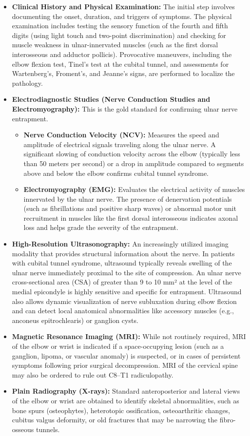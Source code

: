 \begin{itemize}
\item \textbf{Clinical History and Physical Examination:} The initial step involves documenting the onset, duration, and triggers of symptoms. The physical examination includes testing the sensory function of the fourth and fifth digits (using light touch and two-point discrimination) and checking for muscle weakness in ulnar-innervated muscles (such as the first dorsal interosseous and adductor pollicis). Provocative maneuvers, including the elbow flexion test, Tinel's test at the cubital tunnel, and assessments for Wartenberg's, Froment's, and Jeanne's signs, are performed to localize the pathology.
\item \textbf{Electrodiagnostic Studies (Nerve Conduction Studies and Electromyography):} This is the gold standard for confirming ulnar nerve entrapment.
  \begin{itemize}
  \item \textbf{Nerve Conduction Velocity (NCV):} Measures the speed and amplitude of electrical signals traveling along the ulnar nerve. A significant slowing of conduction velocity across the elbow (typically less than 50 meters per second) or a drop in amplitude compared to segments above and below the elbow confirms cubital tunnel syndrome.
  \item \textbf{Electromyography (EMG):} Evaluates the electrical activity of muscles innervated by the ulnar nerve. The presence of denervation potentials (such as fibrillations and positive sharp waves) or abnormal motor unit recruitment in muscles like the first dorsal interosseous indicates axonal loss and helps grade the severity of the entrapment.
  \end{itemize}
\item \textbf{High-Resolution Ultrasonography:} An increasingly utilized imaging modality that provides structural information about the nerve. In patients with cubital tunnel syndrome, ultrasound typically reveals swelling of the ulnar nerve immediately proximal to the site of compression. An ulnar nerve cross-sectional area (CSA) of greater than 9 to 10 mm² at the level of the medial epicondyle is highly sensitive and specific for entrapment. Ultrasound also allows dynamic visualization of nerve subluxation during elbow flexion and can detect local anatomical abnormalities like accessory muscles (e.g., anconeus epitrochlearis) or ganglion cysts.
\item \textbf{Magnetic Resonance Imaging (MRI):} While not routinely required, MRI of the elbow or wrist is indicated if a space-occupying lesion (such as a ganglion, lipoma, or vascular anomaly) is suspected, or in cases of persistent symptoms following prior surgical decompression. MRI of the cervical spine may also be ordered to rule out C8--T1 radiculopathy.
\item \textbf{Plain Radiography (X-rays):} Standard anteroposterior and lateral views of the elbow or wrist are obtained to identify skeletal abnormalities, such as bone spurs (osteophytes), heterotopic ossification, osteoarthritic changes, cubitus valgus deformity, or old fractures that may be narrowing the fibro-osseous tunnels.
\end{itemize}

